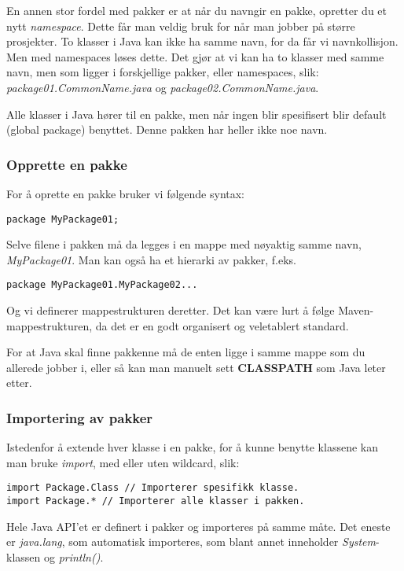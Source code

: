 \documentclass[11pt]{article}
\begin{document}
En annen stor fordel med pakker er at når du navngir en pakke,
opretter du et nytt \emph{namespace}. Dette får man veldig bruk for når man
jobber på større prosjekter. To klasser i Java kan ikke ha samme navn,
for da får vi navnkollisjon. Men med namespaces løses dette. Det gjør
at vi kan ha to klasser med samme navn, men som ligger i forskjellige
pakker, eller namespaces, slik: \emph{package01.CommonName.java} og
\emph{package02.CommonName.java}. 

Alle klasser i Java hører til en pakke, men når ingen blir spesifisert
blir default (global package) benyttet. Denne pakken har heller ikke
noe navn.
\subsubsection{Opprette en pakke}
\label{sec-13_1_1}

For å oprette en pakke bruker vi følgende syntax:

\begin{verbatim}
package MyPackage01;
\end{verbatim}

Selve filene i pakken må da legges i en mappe med nøyaktig samme navn,
\emph{\/MyPackage01\/}. Man kan også ha et hierarki av pakker, f.eks. 

\begin{verbatim}
package MyPackage01.MyPackage02...
\end{verbatim}

Og vi definerer mappestrukturen deretter. Det kan være lurt å følge
Maven-mappestrukturen, da det er en godt organisert og veletablert
standard. 

For at Java skal finne pakkenne må de enten ligge i samme mappe som du
allerede jobber i, eller så kan man manuelt sett \textbf{CLASSPATH} som Java
leter etter.
\subsubsection{Importering av pakker}
\label{sec-13_1_2}

Istedenfor å extende hver klasse i en pakke, for å kunne benytte
klassene kan man bruke \emph{import}, med eller uten wildcard, slik:

\begin{verbatim}
import Package.Class // Importerer spesifikk klasse.
import Package.* // Importerer alle klasser i pakken.
\end{verbatim}

Hele Java API'et er definert i pakker og importeres på samme måte. Det
eneste er \emph{java.lang}, som automatisk importeres, som blant annet
inneholder \emph{System}-klassen og \emph{println()}.
\end{document}
